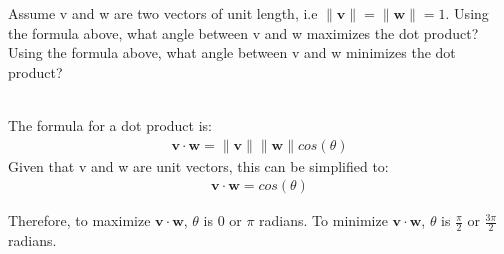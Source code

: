 Assume v and w are two vectors of unit length, i.e $\|\boldsymbol{v}\|= \|\boldsymbol{w}\| = 1$. Using the formula above, what angle between v and w maximizes the dot product? Using the formula above, what angle between v and w minimizes the dot product?

\begin{solution}\ \\
The formula for a dot product is:
\begin{align*}
    \boldsymbol{v} \cdot \boldsymbol{w} = \|\boldsymbol{v}\| \|\boldsymbol{w}\| cos(\theta)
\end{align*}
Given that v and w are unit vectors, this can be simplified to:
\begin{align*}
    \boldsymbol{v} \cdot \boldsymbol{w} = cos(\theta)
\end{align*}

Therefore, to maximize $\boldsymbol{v} \cdot \boldsymbol{w}$, $\theta$ is 0 or $\pi$ radians. To minimize $\boldsymbol{v} \cdot \boldsymbol{w}$, $\theta$ is $\frac{\pi}{2}$ or $\frac{3\pi}{2}$ radians. \\

\end{solution}